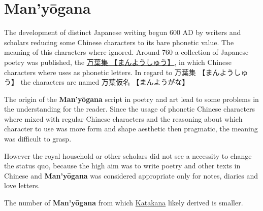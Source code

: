 \section{Man'yōgana} \label{sec:Manyogana}

The development of distinct Japanese writing begun 600 AD by writers and
scholars reducing some Chinese characters to its bare phonetic value. The
meaning of this characters where ignored. Around 760 a collection of Japanese
poetry was published, the \Link
\href{http://en.wikipedia.org/wiki/Man%27y%C5%8Dsh%C5%AB}{万葉集
【まんようしゅう】}, in which Chinese characters where uses as phonetic
letters. In regard to {万葉集} {【まんようしゅう】} the characters are named
{万葉仮名} {【まんようがな】}

The origin of the \textbf{Man'yōgana} script in poetry and art lead to some
problems in the understanding for the reader. Since the usage of phonetic
Chinese characters where mixed with regular Chinese characters and the
reasoning about which character to use was more form and shape aesthetic then
pragmatic, the meaning was difficult to grasp.

However the royal household or other scholars did not see a necessity to change
the status quo, because the high aim was to write poetry and other texts in
Chinese and \textbf{Man'yōgana} was considered appropriate only for notes,
diaries and love letters.


The number of \textbf{Man'yōgana} from which \hyperref[sec:Katakana]{Katakana}
likely derived is smaller.  


